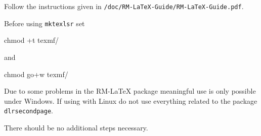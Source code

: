 Follow the instructions given in \verb+/doc/RM-LaTeX-Guide/RM-LaTeX-Guide.pdf+.


Before using \verb+mktexlsr+ set

\begin{code}
chmod +t texmf/
\end{code}

and

\begin{code}
chmod go+w texmf/
\end{code}

Due to some problems in the RM-\LaTeX{} package meaningful use is only possible under Windows. If using with Linux do not use everything related to the package \verb+dlrsecondpage+.


There should be no additional steps necessary.